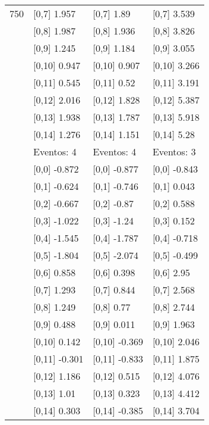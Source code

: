 \begin{table}
\begin{tabular}[t]{llll}
750 & {}[0,7] 1.957 & {}[0,7] 1.89 & {}[0,7] 3.539\\
\addlinespace
 & {}[0,8] 1.987 & {}[0,8] 1.936 & {}[0,8] 3.826\\
 & {}[0,9] 1.245 & {}[0,9] 1.184 & {}[0,9] 3.055\\
 & {}[0,10] 0.947 & {}[0,10] 0.907 & {}[0,10] 3.266\\
 & {}[0,11] 0.545 & {}[0,11] 0.52 & {}[0,11] 3.191\\
 & {}[0,12] 2.016 & {}[0,12] 1.828 & {}[0,12] 5.387\\
\addlinespace
 & {}[0,13] 1.938 & {}[0,13] 1.787 & {}[0,13] 5.918\\
 & {}[0,14] 1.276 & {}[0,14] 1.151 & {}[0,14] 5.28\\
 & Eventos:  4 & Eventos:  4 & Eventos:  3\\
 & {}[0,0] -0.872 & {}[0,0] -0.877 & {}[0,0] -0.843\\
 & {}[0,1] -0.624 & {}[0,1] -0.746 & {}[0,1] 0.043\\
\addlinespace
 & {}[0,2] -0.667 & {}[0,2] -0.87 & {}[0,2] 0.588\\
 & {}[0,3] -1.022 & {}[0,3] -1.24 & {}[0,3] 0.152\\
 & {}[0,4] -1.545 & {}[0,4] -1.787 & {}[0,4] -0.718\\
 & {}[0,5] -1.804 & {}[0,5] -2.074 & {}[0,5] -0.499\\
 & {}[0,6] 0.858 & {}[0,6] 0.398 & {}[0,6] 2.95\\
\addlinespace
1000 & {}[0,7] 1.293 & {}[0,7] 0.844 & {}[0,7] 2.568\\
 & {}[0,8] 1.249 & {}[0,8] 0.77 & {}[0,8] 2.744\\
 & {}[0,9] 0.488 & {}[0,9] 0.011 & {}[0,9] 1.963\\
 & {}[0,10] 0.142 & {}[0,10] -0.369 & {}[0,10] 2.046\\
 & {}[0,11] -0.301 & {}[0,11] -0.833 & {}[0,11] 1.875\\
\addlinespace
 & {}[0,12] 1.186 & {}[0,12] 0.515 & {}[0,12] 4.076\\
 & {}[0,13] 1.01 & {}[0,13] 0.323 & {}[0,13] 4.412\\
 & {}[0,14] 0.303 & {}[0,14] -0.385 & {}[0,14] 3.704\\
\bottomrule
\end{tabular}
\end{table}
